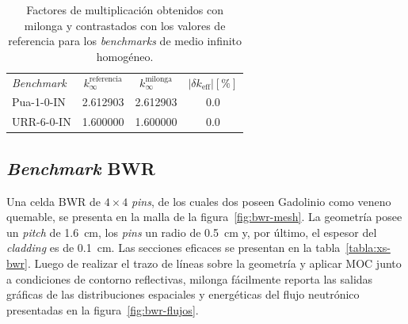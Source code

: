 \documentclass[11pt]{article}
\numberwithin{equation}{section}
\begin{document}
{
\begin{table}[ht!]
\begin{center}
\begin{tabular}{lccc}
\small \emph{Benchmark}  & \small $k_{\infty}^{\text{referencia}}$  & \small $k_{\infty}^{\text{milonga}}$  & \small $ \left| \delta  k_{\text{eff}} \right| \left[ \si{\percent} \right] $ \\
\small Pua-1-0-IN        & \tiny \num{2.612903}                     & \tiny \num{2.612903}                  & \tiny \num{0.0}     \\
\small URR-6-0-IN        & \tiny \num{1.600000}                     & \tiny \num{1.600000}                  & \tiny \num{0.0} 
\end{tabular}
\caption{\label{tabla:k-infty} Factores de multiplicación obtenidos con milonga y contrastados con los valores de referencia para los \emph{benchmarks} de medio infinito homogéneo.}
\end{center}
\end{table}
}


\subsection{\emph{Benchmark} BWR}

Una celda BWR de $\num{4} \times \num{4}$ \emph{pins}, de los cuales dos poseen Gadolinio como veneno quemable, se presenta en la malla de la figura~\ref{fig:bwr-mesh}. La geometr\'ia posee un \emph{pitch} de \SI{1.6}{\centi\metre}, los \emph{pins} un radio de \SI{0.5}{\centi\metre} y, por \'ultimo, el espesor del \emph{cladding} es de \SI{0.1}{\centi\metre}. Las secciones eficaces se presentan en la tabla~\ref{tabla:xs-bwr}. Luego de realizar el trazo de l\'ineas sobre la geometr\'ia y aplicar MOC junto a condiciones de contorno reflectivas, milonga f\'acilmente reporta las salidas gr\'aficas de las distribuciones espaciales y energ\'eticas del flujo neutrónico presentadas en la figura~\ref{fig:bwr-flujos}.
 
\end{document}
